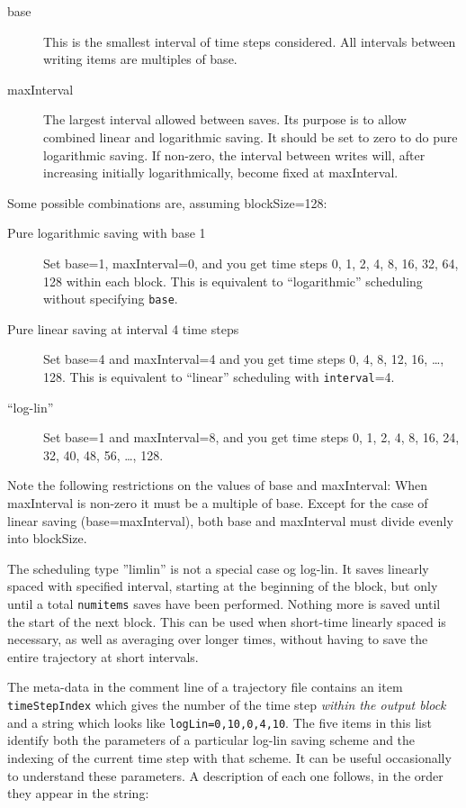 \documentclass[a4paper]{article}
\begin{document}
\begin{description}
\item[base] This is the smallest interval of time steps considered. 
All intervals between writing items are multiples of base.
\item[maxInterval] The largest interval allowed between saves. Its purpose is 
to allow combined linear and
logarithmic saving. It should be set to zero to do pure logarithmic saving.
If non-zero, the interval between writes will, after increasing initially
logarithmically, become fixed at maxInterval.
\end{description}

Some possible combinations are, assuming blockSize=128:

\begin{description}
\item[Pure logarithmic saving with base 1] Set base=1, maxInterval=0, and you
get time steps 0, 1, 2, 4, 8, 16, 32, 64, 128 within each block. This is 
equivalent to ``logarithmic'' scheduling without specifying \verb|base|.
\item[Pure linear saving at interval 4 time steps] Set base=4 and maxInterval=4
and you get time steps 0, 4, 8, 12, 16, \ldots, 128. This is equivalent to
``linear'' scheduling with \verb|interval|=4.
\item[``log-lin''] Set base=1 and maxInterval=8, and you
get time steps 0, 1, 2, 4, 8, 16, 24, 32, 40, 48, 56, \ldots, 128. 
\end{description}


Note the following restrictions on the values of base
and maxInterval:  When maxInterval is non-zero it must be a 
multiple of base. Except for the case of linear saving (base=maxInterval), both
base and maxInterval must divide evenly into blockSize. 

The scheduling type ''limlin'' is not a special case og log-lin. It saves linearly spaced with specified interval, starting at the beginning of the block, but only until a total \verb|numitems| saves have been performed. Nothing more is saved until the start of the next block. This can be used when short-time linearly spaced is necessary, as well as averaging over longer times, without having to save the entire trajectory at short intervals.


The meta-data in the comment line of a trajectory file contains an item
\verb|timeStepIndex| which gives the number of the time step {\em within the
output block} and a string which looks like \verb|logLin=0,10,0,4,10|.
The five items in this list identify both the parameters of a particular 
log-lin saving scheme and the indexing of the current time step with that 
scheme. It can be useful occasionally to understand these parameters.
A description of each one follows, in the order they appear in the string:
\end{document}
